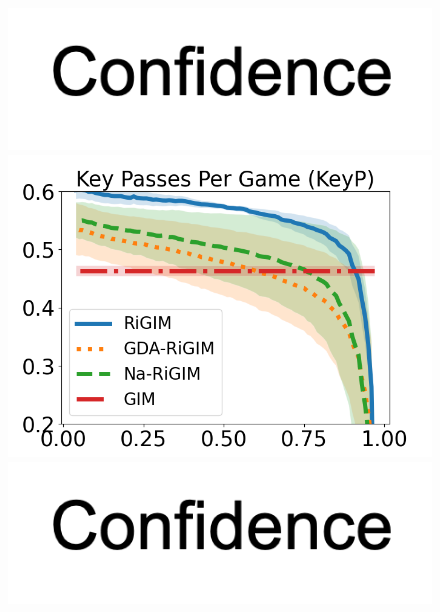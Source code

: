 \documentclass{article}
\begin{document}
\begin{figure}[htbp]
\begin{minipage}{0.16\textwidth}
    \vspace{-0.05in}
    \includegraphics[scale=0.12]{figures/confidence_x_label.png}
    \end{minipage}
    \begin{minipage}{0.16\textwidth}
    \centering
    \includegraphics[scale=0.14]{figures/soccer_risk_curve_KeyP_shadow.png}\par
    \vspace{-0.05in}
    \includegraphics[scale=0.12]{figures/confidence_x_label.png}
    \end{minipage}
    \begin{minipage}{0.16\textwidth}
    \centering

\end{minipage}
\end{figure}
\end{document}
